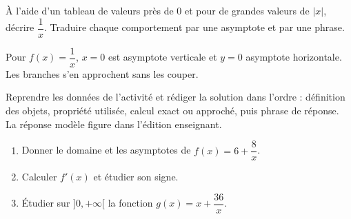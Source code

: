 \begin{activite}
À l'aide d'un tableau de valeurs près de $0$ et pour de grandes valeurs de $|x|$, décrire $\dfrac1x$. Traduire chaque comportement par une asymptote et par une phrase.
\begin{center}\end{center}
\end{activite}

\begin{traceecrite}Pour $f(x)=\dfrac1x$, $x=0$ est asymptote verticale et $y=0$ asymptote horizontale. Les branches s'en approchent sans les couper.\end{traceecrite}

\begin{exemple}
Reprendre les données de l'activité et rédiger la solution dans l'ordre : définition des objets, propriété utilisée, calcul exact ou approché, puis phrase de réponse. La réponse modèle figure dans l'édition enseignant.
\end{exemple}

\begin{exercice}[-- essentiel]
\begin{enumerate}\item Donner le domaine et les asymptotes de $f(x)=6+\dfrac{8}x$.\item Calculer $f'(x)$ et étudier son signe.\item Étudier sur $]0,+\infty[$ la fonction $g(x)=x+\dfrac{36}x$.\end{enumerate}
\end{exercice}

